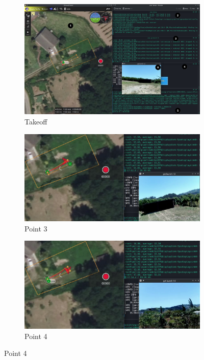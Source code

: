\begin{figure}[!hbt]
  \centering
  \begin{subfigure}[t]{\textwidth}
    \centering
    \includegraphics[width=1.0\textwidth]{./img/png/bao-fpv-takeoff-annot} 
    \caption{Takeoff}%
    \label{fig:mission-exec-case1}
  \end{subfigure}

  \begin{subfigure}[t]{0.49\textwidth}
    \centering
    \includegraphics[width=\linewidth]{./img/png/bao-fpv-3-annot}
    \caption{Point 3}%
    \label{fig:mission-exec-case2}
  \end{subfigure}
  \hfill
  \begin{subfigure}[t]{0.49\textwidth}
    \centering
    \includegraphics[width=\linewidth]{./img/png/bao-fpv-4-annot} 
    \caption{Point 4}%
    \label{fig:mission-exec-case3}
  \end{subfigure}


\end{figure}
